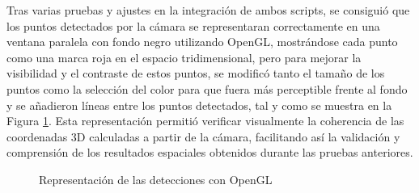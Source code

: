 Tras varias pruebas y ajustes en la integración de ambos scripts, se consiguió que los puntos detectados por la cámara se representaran correctamente en una ventana paralela con fondo negro utilizando OpenGL, mostrándose cada punto como una marca roja en el espacio tridimensional, pero para mejorar la visibilidad y el contraste de estos puntos, se modificó tanto el tamaño de los puntos como la selección del color para que fuera más perceptible frente al fondo y se añadieron líneas entre los puntos detectados, tal y como se muestra en la Figura \ref{fig:openGL_ventana}. Esta representación permitió verificar visualmente la coherencia de las coordenadas 3D calculadas a partir de la cámara, facilitando así la validación y comprensión de los resultados espaciales obtenidos durante las pruebas anteriores.

    \begin{figure}[H]
      \begin{center}
        \subcapcentertrue
        \hspace{1mm}
      \end{center}
      \caption{Representación de las detecciones con OpenGL}
      \label{fig:openGL_ventana}
    \end{figure}

